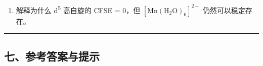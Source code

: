 \begin{enumerate}
  \begin{enumerate}
  \def\labelenumii{(\alph{enumii})}
  \tightlist
  \item
    分别写出 Fe\textsuperscript{3+} 的 d 电子排布。
  \item
    解释磁矩差异的电子结构原因。
  \item
    从光谱化学序列角度解释为什么 F\textsuperscript{-} 是弱场配体而 CN\textsuperscript{-} 是强场配体。
  \end{enumerate}
\item
  解释为什么 d\textsuperscript{5} 高自旋的 CFSE = 0，但 \([\mathrm{Mn(H_2O)_6}]^{2+}\) 仍然可以稳定存在。
\end{enumerate}

\begin{center}\rule{0.5\linewidth}{0.5pt}\end{center}

\subsection{七、参考答案与提示}\label{ux4e03ux53c2ux8003ux7b54ux6848ux4e0eux63d0ux793a}

